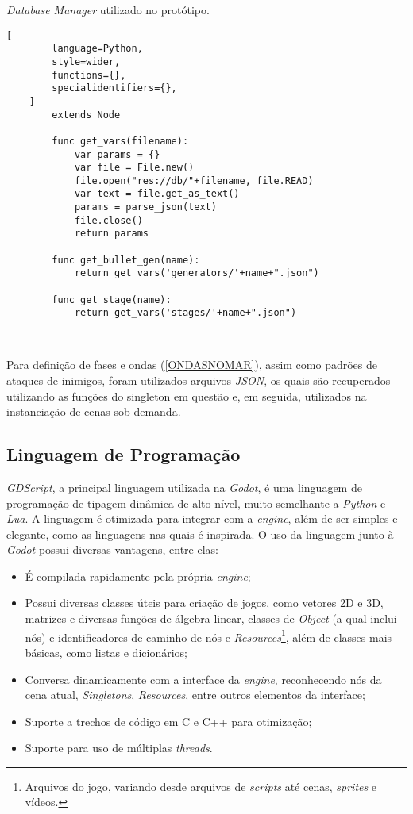 \pagebreak

\begin{programruledcaption}{\textit{Database Manager} utilizado no protótipo.\label{prog:db_manager}}
    \begin{lstlisting}[
        language=Python,
        style=wider,
        functions={},
        specialidentifiers={},
    ]
        extends Node

        func get_vars(filename):
            var params = {}
            var file = File.new()
            file.open("res://db/"+filename, file.READ)
            var text = file.get_as_text()
            params = parse_json(text)
            file.close()
            return params
        
        func get_bullet_gen(name):
            return get_vars('generators/'+name+".json")
        
        func get_stage(name):
            return get_vars('stages/'+name+".json")
        
    
    \end{lstlisting}
\end{programruledcaption}

Para definição de fases e ondas (\ref{ONDASNOMAR}), assim como padrões de ataques de inimigos, foram utilizados arquivos \textit{JSON}, os quais são recuperados utilizando as funções do singleton em questão e, em seguida, utilizados na instanciação de cenas sob demanda.

\subsection{Linguagem de Programação}

\textit{GDScript}, a principal linguagem utilizada na \textit{Godot}, é uma linguagem de programação de tipagem dinâmica de alto nível, muito semelhante a \textit{Python} e \textit{Lua}. A linguagem é otimizada para integrar com a \textit{engine}, além de ser simples e elegante, como as linguagens nas quais é inspirada. O uso da linguagem junto à \textit{Godot} possui diversas vantagens, entre elas:

\begin{itemize}
    \item É compilada rapidamente pela própria \textit{engine};
    \item Possui diversas classes úteis para criação de jogos, como vetores 2D e 3D, matrizes e diversas funções de álgebra linear, classes de \textit{Object} (a qual inclui nós) e identificadores de caminho de nós e \textit{Resources}\footnote{
        Arquivos do jogo, variando desde arquivos de \textit{scripts} até cenas, \textit{sprites} e vídeos.
    }, além de classes mais básicas, como listas e dicionários;
    \item Conversa dinamicamente com a interface da \textit{engine}, reconhecendo nós da cena atual, \textit{Singletons}, \textit{Resources}, entre outros elementos da interface;
    \item Suporte a trechos de código em C e C++ para otimização;
    \item Suporte para uso de múltiplas \textit{threads}.
\end{itemize}

